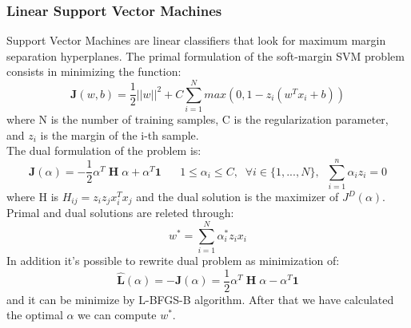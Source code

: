 
\subsubsection{Linear Support Vector Machines}
Support Vector Machines are linear classifiers that look for maximum margin separation hyperplanes. The primal formulation of the soft-margin SVM problem consists in minimizing the function:
\begin{equation}
    \mathbf{J}(w,b)= \frac{1}{2}||w||^2 + C\sum_{i=1}^{N}max(0,1-z_i(w^Tx_i+b))
\end{equation}
where N is the number of training samples, C is the regularization parameter, and \(z_i\) is the margin of the i-th sample.\\
The dual formulation of the problem is:
\begin{equation}
    \mathbf{J}(\alpha)= - \frac{1}{2} \alpha^T \;\textbf{H} \;\alpha + \alpha^T \textbf{1} \;\;\;\;\;\;1\leq \alpha_i\leq C,\;\; \forall i \in \{1,...,N\},\;\; \sum_{i=1}^{n}\alpha_i z_i=0
\end{equation}
where H is \(H_{ij}=z_iz_jx_i^Tx_j\) and the dual solution is the maximizer of \(J^D(\alpha)\).\\
Primal and dual solutions are releted through:
\begin{equation}
    w^*=\sum_{i=1}^{N}\alpha_i^* z_i x_i
\end{equation}
In addition it's possible to rewrite dual problem as minimization of:
\begin{equation}
    \hat{\mathbf{L}}(\alpha)=-\mathbf{J}(\alpha)= \frac{1}{2} \alpha^T \;\textbf{H} \;\alpha - \alpha^T \textbf{1}
\end{equation}
and it can be minimize by L-BFGS-B algorithm.
After that we have calculated the optimal \(\alpha\) we can compute \(w^*\).

%
%
